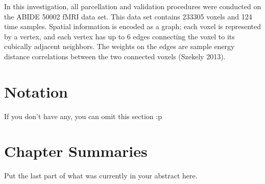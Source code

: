 In this investigation, all parcellation and validation procedures were
conducted on the ABIDE 50002 fMRI data set. This data set contains
233305 voxels and 124 time samples. Spatial information is encoded as a
graph; each voxel is represented by a vertex, and each vertex has up to
6 edges connecting the voxel to its cubically adjacent neighbors. The
weights on the edges are sample energy distance correlations between the
two connected voxels (Szekely 2013).

\section{Notation}
{\color{red}If you don't have any, you can omit this section :p}

\section{Chapter Summaries}
{\color{red}Put the last part of what was currently in your abstract here.}

